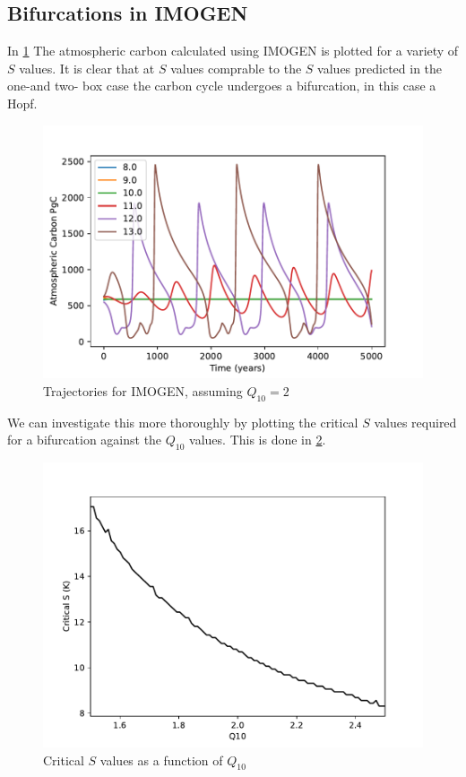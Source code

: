 \subsection{Bifurcations in IMOGEN}
In \cref{fig:imogen_trajectories} The atmospheric carbon calculated using IMOGEN is plotted for a variety of $S$ values. It is clear that at $S$ values comprable to the $S$ values
predicted in the one-and two- box case the carbon cycle undergoes a bifurcation, in this case a Hopf.
\begin{figure}
  \centering
  \includegraphics[width=\textwidth,keepaspectratio]{imogen_traj}
  \caption{Trajectories for IMOGEN, assuming $Q_{10} = 2$}
  \label{fig:imogen_trajectories}
\end{figure}
We can investigate this more thoroughly by plotting the critical $S$ values required for a bifurcation against the $Q_{10}$ values. This is done in \cref{fig:critical_S_vs_Q10}.
\begin{figure}
  \centering
  \includegraphics[width=\textwidth,keepaspectratio]{imogen_critical_values}
  \caption{Critical $S$ values as a function of $Q_{10}$}
  \label{fig:critical_S_vs_Q10}
\end{figure}

